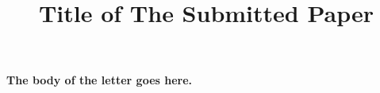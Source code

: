 \documentclass[12pt,a4paper, oneside]{jcletter}
\affiliation{Department, University, Address, Postcode, Country}
\title{Title of The Submitted Paper}
\begin{document}
\maketitle

\textbf{The body of the letter goes here.} \lipsum[1]

\insertsig
\end{document}
